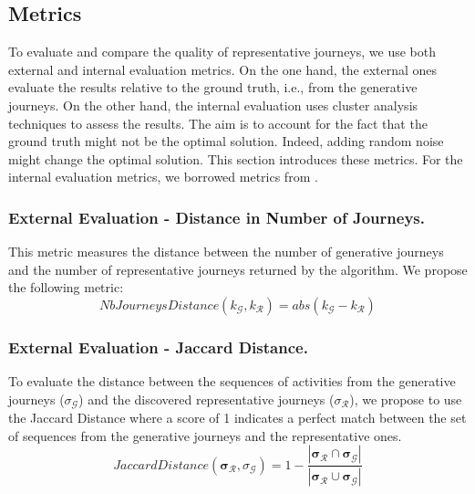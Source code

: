 \documentclass[runningheads]{llncs}
\begin{document}
{{{\subsection{Metrics}
To evaluate and compare the quality of representative journeys, we use both external and internal evaluation metrics. On the one hand, the external ones evaluate the results relative to the ground truth, i.e., from the generative journeys. On the other hand, the internal evaluation uses cluster analysis techniques to assess the results. The aim is to account for the fact that the ground truth might not be the optimal solution. Indeed, adding random noise might change the optimal solution. This section introduces these metrics. For the internal evaluation metrics, we borrowed metrics from \cite{gabadinho2009extracting}.


\subsubsection{External Evaluation - Distance in Number of Journeys.} This metric measures the distance between the number of generative journeys and the number of representative journeys returned by the algorithm. We propose the following metric:
\begin{equation}
    NbJourneysDistance({k_{\mathcal{G}}}, {k_{\mathcal{R}}}) = abs({k_{\mathcal{G}}} - {k_{\mathcal{R}}}) 
\end{equation}

\subsubsection{External Evaluation - Jaccard Distance.} To evaluate the distance between the sequences of activities from the generative journeys ($\sigma_{\mathcal{G}}$) and the discovered representative journeys ($\sigma_{\mathcal{R}}$), we propose to use the Jaccard Distance where a score of 1 indicates a perfect match between the set of sequences from the generative journeys and the representative ones. 
\begin{equation}
    JaccardDistance(\mathbf{\sigma_{\mathcal{R}}}, \sigma_{\mathcal{G}}) = 1 - \frac{|\mathbf{\sigma_{\mathcal{R}} \cap \sigma_{\mathcal{G}}}|}{|\mathbf{\sigma_{\mathcal{R}} \cup \sigma_{\mathcal{G}}}|}
\end{equation}

}}}
\end{document}
